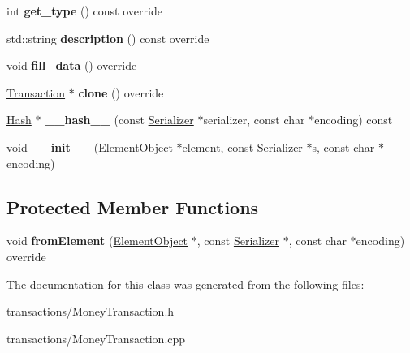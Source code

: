 \begin{DoxyCompactItemize}
int {\bfseries get\+\_\+type} () const override
\item 
\mbox{\label{classMoneyTransaction_a23b793077f5c5e3157155df148e0d5e1}} 
std\+::string {\bfseries description} () const override
\item 
\mbox{\label{classMoneyTransaction_a8666737a342f5eb1856006cd970967bf}} 
void {\bfseries fill\+\_\+data} () override
\item 
\mbox{\label{classMoneyTransaction_af777b46f577df3c089a44c78c1aebc40}} 
\mbox{\hyperlink{classTransaction}{Transaction}} $\ast$ {\bfseries clone} () override
\item 
\mbox{\label{classTransaction_a1f0df166c34d6a38a991544cf98c0356}} 
\mbox{\hyperlink{classHash}{Hash}} $\ast$ {\bfseries \+\_\+\+\_\+hash\+\_\+\+\_\+} (const \mbox{\hyperlink{classSerializer}{Serializer}} $\ast$serializer, const char $\ast$encoding) const
\item 
\mbox{\label{classComponent_a28212595f8ee85fe009bd233bc99b2fc}} 
void {\bfseries \+\_\+\+\_\+init\+\_\+\+\_\+} (\mbox{\hyperlink{classElementObject}{Element\+Object}} $\ast$element, const \mbox{\hyperlink{classSerializer}{Serializer}} $\ast$s, const char $\ast$encoding)
\end{DoxyCompactItemize}
\subsection*{Protected Member Functions}
\begin{DoxyCompactItemize}
\item 
\mbox{\label{classMoneyTransaction_a6f4672dba3a75e2782d15366d9ed7a1e}} 
void {\bfseries from\+Element} (\mbox{\hyperlink{classElementObject}{Element\+Object}} $\ast$, const \mbox{\hyperlink{classSerializer}{Serializer}} $\ast$, const char $\ast$encoding) override
\end{DoxyCompactItemize}


The documentation for this class was generated from the following files\+:\begin{DoxyCompactItemize}
\item 
transactions/Money\+Transaction.\+h\item 
transactions/Money\+Transaction.\+cpp\end{DoxyCompactItemize}
